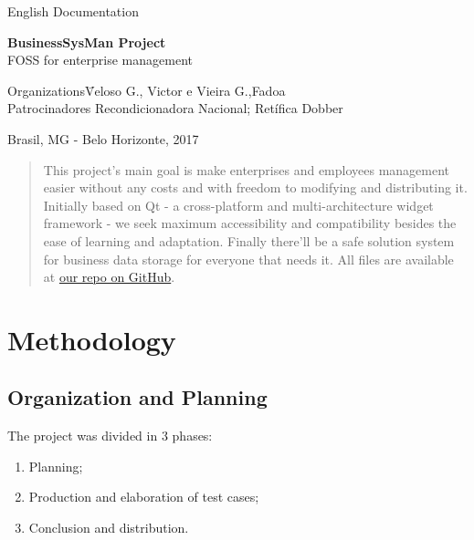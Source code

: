 \documentclass[a4paper,12pt]{article}
\newcommand{\thecompany}{\huge English Documentation}
\newcommand{\thelogo}{\begin{figure}[H] \centering \texttt{[image: BRASAOUFV.jpg]} \end{figure}}
\newcommand{\thedate}{\today}
\newcommand{\thetitle}{\textbf{\LARGE  BusinessSysMan Project} \\ \large{FOSS for enterprise management}}
\newcommand{\theauthor}{Veloso G., Victor e Vieira G.,Fadoa}
\begin{document}
	
	\begin{titlepage}
		\begin{center}
			\thecompany
			
			
			\vspace{10pt}
			
			
			\vspace{60pt}
			
			\thetitle
			
			\vspace{160pt}
			
		\end{center}
		
		\begin{flushleft}
			\begin{tabbing}
				Organizations\qquad\qquad\= \theauthor \\
				Patrocinadores\> Recondicionadora Nacional; Retífica Dobber\\
				
			\end{tabbing}
			
		\end{flushleft}
		
		\begin{center}
			\vspace{\fill}
			Brasil, MG - Belo Horizonte, 2017%
		\end{center}
	\end{titlepage}
	\tableofcontents
	\thispagestyle{empty}
	\clearpage
	\setcounter{page}{1}
	\begin{abstract}
	This project's main goal is make enterprises and employees management easier without any costs and with freedom to modifying and distributing it. Initially based on Qt - a cross-platform and multi-architecture widget framework - we seek maximum accessibility and compatibility besides the ease of learning and adaptation. Finally there'll be a safe solution system for business data storage for everyone that needs it. All files are available at \href{https://github.com/primary157/TP1AEDS1.git}{our repo on GitHub}. 
	\end{abstract}
	\section{Methodology}
	
		\subsection{Organization and Planning}
			The project was divided in 3 phases:
			\begin{enumerate}
				\item Planning;
				\item Production and elaboration of test cases;
				\item Conclusion and distribution.
			\end{enumerate}
\end{document}
